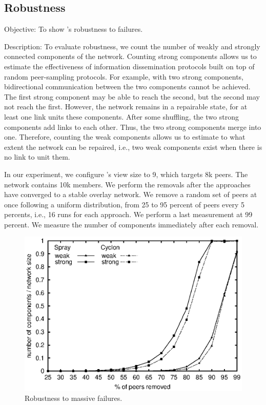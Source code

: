 \subsection{Robustness}

\begin{asparadesc}
\item[Objective:] To show \SPRAY's robustness to failures.
\item[Description:] To evaluate robustness, we count the number of weakly and
  strongly connected components of the network. Counting strong components
  allows us to estimate the effectiveness of information dissemination protocols
  built on top of random peer-sampling protocols. For example, with two strong
  components, bidirectional communication between the two components cannot be
  achieved. The first strong component may be able to reach the second, but the
  second may not reach the first. However, the network remains in a repairable
  state, for at least one link units these components. After some shuffling, the
  two strong components add links to each other. Thus, the two strong components
  merge into one. Therefore, counting the weak components allows us to estimate
  to what extent the network can be repaired, i.e., two weak components exist
  when there is no link to unit them.

  In our experiment, we configure \CYCLON's view size to 9, which targets 8k
  peers. The network contains 10k members. We perform the removals after the
  approaches have converged to a stable overlay network. We remove a random set
  of peers at once following a uniform distribution, from 25 to 95 percent of
  peers every 5 percents, i.e., 16 runs for each approach. We perform a last
  measurement at 99 percent. We measure the number of components immediately
  after each removal.

\begin{figure}
  \centering
  \includegraphics[width=\SCALE\textwidth]{img/resilience.eps}
  \caption{\label{fig:resilience}Robustness to massive failures.}
\end{figure}


\end{asparadesc}
